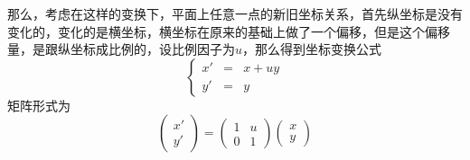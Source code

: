 那么，考虑在这样的变换下，平面上任意一点的新旧坐标关系，首先纵坐标是没有变化的，变化的是横坐标，横坐标在原来的基础上做了一个偏移，但是这个偏移量，是跟纵坐标成比例的，设比例因子为$u$，那么得到坐标变换公式
\begin{equation}
  \label{eq:scale-translation-coordinate-formula}
  \left\{
    \begin{array}{ccc}
      x' & = &  x + uy \\
      y' & = &  y
    \end{array}
  \right.
\end{equation}
矩阵形式为
\begin{equation*}
  \left(
    \begin{array}{c}
      x' \\
      y'
    \end{array}
  \right)
    =
    \left(
      \begin{array}{cc}
        1 & u \\
        0 & 1
      \end{array}
    \right)
  \left(
    \begin{array}{c}
      x \\
      y
    \end{array}
  \right)
\end{equation*}

